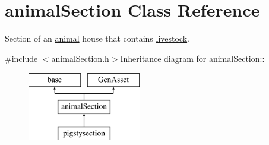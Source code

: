 \hypertarget{classanimal_section}{
\section{animalSection Class Reference}
\label{classanimal_section}
}


Section of an \hyperlink{classanimal}{animal} house that contains \hyperlink{classlivestock}{livestock}.  


{\ttfamily \#include $<$animalSection.h$>$}Inheritance diagram for animalSection::\begin{figure}[H]
\begin{center}
\leavevmode
\includegraphics[height=3cm]{classanimal_section}
\end{center}
\end{figure}
